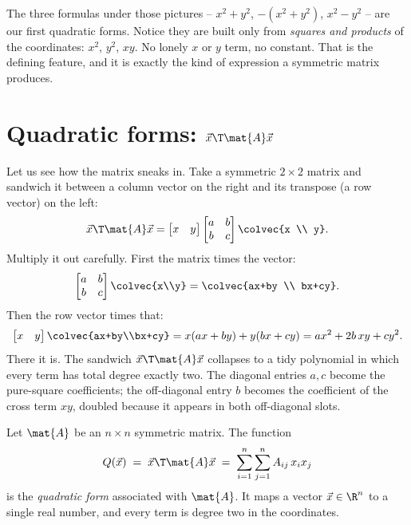 The three formulas under those pictures -- $x^2+y^2$, $-(x^2+y^2)$, $x^2-y^2$ -- are
our first quadratic forms. Notice they are built only from \emph{squares and
products} of the coordinates: $x^2$, $y^2$, $xy$. No lonely $x$ or $y$ term, no
constant. That is the defining feature, and it is exactly the kind of expression a
symmetric matrix produces.

\section{Quadratic forms: \texorpdfstring{$\vec{x}\T\mat{A}\vec{x}$}{x'Ax}}
\label{ch36:quadforms}

Let us see how the matrix sneaks in. Take a symmetric $2\times 2$ matrix and sandwich
it between a column vector on the right and its transpose (a row vector) on the left:
\[
  \vec{x}\T\mat{A}\vec{x}
  = \begin{bmatrix} x & y \end{bmatrix}
    \begin{bmatrix} a & b \\ b & c \end{bmatrix}
    \colvec{x \\ y}.
\]
Multiply it out carefully. First the matrix times the vector:
\[
  \begin{bmatrix} a & b \\ b & c \end{bmatrix}\colvec{x\\y}
  = \colvec{ax+by \\ bx+cy}.
\]
Then the row vector times that:
\[
  \begin{bmatrix} x & y \end{bmatrix}\colvec{ax+by\\bx+cy}
  = x(ax+by) + y(bx+cy)
  = a x^2 + 2b\,xy + c y^2.
\]
There it is. The sandwich $\vec{x}\T\mat{A}\vec{x}$ collapses to a tidy polynomial in
which every term has total degree exactly two. The diagonal entries $a,c$ become the
pure-square coefficients; the off-diagonal entry $b$ becomes the coefficient of the
cross term $xy$, doubled because it appears in both off-diagonal slots.

\begin{definition}
\label{ch36:def-qform}
Let $\mat{A}$ be an $n\times n$ symmetric matrix. The function
\[
  Q(\vec{x}) \;=\; \vec{x}\T\mat{A}\vec{x} \;=\; \sum_{i=1}^{n}\sum_{j=1}^{n} A_{ij}\,x_i x_j
\]
is the \emph{quadratic form} associated with $\mat{A}$. It maps a vector $\vec{x}\in
\R^n$ to a single real number, and every term is degree two in the coordinates.
\end{definition}

